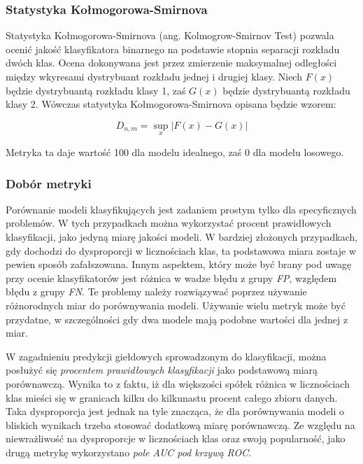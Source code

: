 \documentclass[a4paper, twoside, 11pt, openright]{article}
\begin{document}
\subsubsection{Statystyka Kołmogorowa-Smirnova}

Statystyka Kołmogorowa-Smirnova (ang. Kolmogrow-Smirnov Test) \cite{kolsmirtest} pozwala ocenić jakość klasyfikatora binarnego na podstawie stopnia separacji rozkładu dwóch klas. Ocena dokonywana jest przez zmierzenie maksymalnej odległości między wkyresami dystrybuant rozkładu jednej i drugiej klasy. Niech $F(x)$ będzie dystrybuantą rozkładu klasy 1, zaś $G(x)$ będzie dystrybuantą rozkładu klasy 2. Wówczas statystyka Kołmogorowa-Smirnova opisana będzie wzorem:

\begin{equation}
D_{n,m}=\sup_x|F(x)-G(x)|
\end{equation}

Metryka ta daje wartość 100 dla modelu idealnego, zaś 0 dla modelu losowego.

\subsubsection{Dobór metryki}

Porównanie modeli klasyfikujących jest zadaniem prostym tylko dla specyficznych problemów. W tych przypadkach można wykorzystać procent prawidłowych klasyfikacji, jako jedyną miarę jakości modeli. W bardziej złożonych przypadkach, gdy dochodzi do dysproporcji w licznościach klas, ta podstawowa miara zostaje w pewien sposób zafałszowana. Innym aspektem, który może być brany pod uwagę przy ocenie klasyfikatorów jest różnica w wadze błędu z grupy \textit{FP}, względem błędu z grupy \textit{FN}. Te problemy należy rozwiązywać poprzez używanie różnorodnych miar do porównywania modeli. Używanie wielu metryk może być przydatne, w szczególności gdy dwa modele mają podobne wartości dla jednej z miar.

\bigskip

W zagadnieniu predykcji giełdowych sprowadzonym do klasyfikacji, można posłużyć się \textit{procentem prawidłowych klasyfikacji} jako podstawową miarą porównawczą. Wynika to z faktu, iż dla większości spółek różnica w licznościach klas mieści się w granicach kilku do kilkunastu procent całego zbioru danych. Taka dysproporcja jest jednak na tyle znacząca, że dla porównywania modeli o bliskich wynikach trzeba stosować dodatkową miarę porównawczą. Ze względu na niewrażliwość na dysproporcje w licznościach klas oraz swoją popularność, jako drugą metrykę wykorzystano \textit{pole AUC pod krzywą ROC}.
\end{document}
